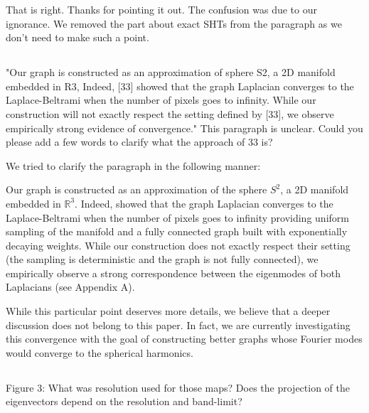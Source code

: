 \documentclass[12pt,a4paper]{article}
\newcommand{\mdeff}[1]{{\color[rgb]{.1,.6,.1}{MD: #1}}}
\newcommand{\1}{\b{1}}              %
\newcommand{\0}{\b{0}}              %
\begin{document}
That is right.
Thanks for pointing it out.
The confusion was due to our ignorance.
We removed the part about exact SHTs from the paragraph as we don't need to make such a point.


\subsection{}
\begin{mdframed}[style=comment]
"Our graph is constructed as an approximation of sphere S2, a 2D manifold embedded in R3, Indeed, [33] showed that the graph Laplacian converges to the Laplace-Beltrami when the number of pixels goes to infinity. While our construction will not exactly respect the setting defined by [33], we observe empirically strong evidence of convergence." This paragraph is unclear. Could you please add a few words to clarify what the approach of 33 is?
\end{mdframed}

We tried to clarify the paragraph in the following manner:
\begin{mdframed}[style=manuscript]
Our graph is constructed as an approximation of the sphere $S^2$, a 2D manifold embedded in $\mathbb{R}^3$.
Indeed, \cite{belkin2007convergence} showed that the graph Laplacian converges to the Laplace-Beltrami when the number of pixels goes to infinity providing uniform sampling of the manifold and a fully connected graph built with exponentially decaying weights.
While our construction does not exactly respect their setting (the sampling is deterministic and the graph is not fully connected), we empirically observe a strong correspondence between the eigenmodes of both Laplacians (see Appendix A).
\end{mdframed}

While this particular point deserves more details, we believe that a deeper discussion does not belong to this paper.
In fact, we are currently investigating this convergence with the goal of constructing better graphs whose Fourier modes would converge to
the spherical harmonics.

\subsection{}

\begin{mdframed}[style=comment]
Figure 3: What was resolution used for those maps? Does the projection of the eigenvectors depend on the resolution and band-limit?
\end{mdframed}
\end{document}
